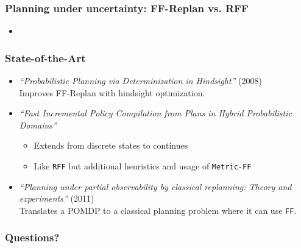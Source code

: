 \documentclass{beamer}
\let\origframetitle=\frametitle
\renewcommand\frametitle[1]{\origframetitle{\textbf{\large{\textrm{#1}}}}}
\begin{document}
\begin{frame}
  \frametitle{Planning under uncertainty: FF-Replan vs. RFF}

  \begin{itemize}
    \item
  \end{itemize}
\end{frame}

\begin{frame}
  \frametitle{State-of-the-Art}

  \begin{itemize}
    \item \emph{``Probabilistic Planning via Determinization in Hindsight''} (2008) \\
      Improves FF-Replan with hindsight optimization.
    \item \emph{``Fast Incremental Policy Compilation from Plans in Hybrid Probabilistic Domains''}
      \begin{itemize}
        \item Extends from discrete states to continues
        \item Like \texttt{RFF} but additional heuristics and usage of \texttt{Metric-FF}
      \end{itemize}
    \item \emph{``Planning under partial observability by classical replanning: Theory and experiments''} (2011) \\
      Translates a POMDP to a classical planning problem where it can use \texttt{FF}.
  \end{itemize}

\end{frame}


\begin{frame}
  \frametitle{Questions?}
\end{frame}
\end{document}
